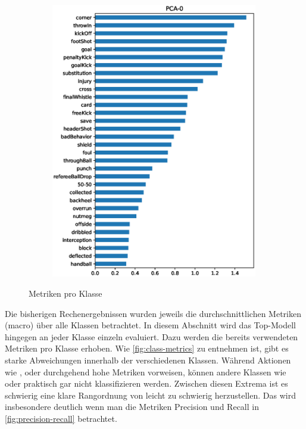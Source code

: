 \begin{figure}
\begin{subfigure}{.24\textwidth}
        \includegraphics[width=0.99\textwidth, keepaspectratio, interpolate]{img/07_PCA_by_class_test_202012-2218-2843.eps}
    \end{subfigure}
    \caption{Metriken pro Klasse}
    \label{fig:class-metrics}
\end{figure}

Die bisherigen Rechenergebnissen wurden jeweils die durchschnittlichen Metriken (macro) über alle Klassen betrachtet.
In diesem Abschnitt wird das Top-Modell hingegen an jeder Klasse einzeln evaluiert.
Dazu werden die bereits verwendeten Metriken pro Klasse erhoben.
Wie \autoref{fig:class-metrics} zu entnehmen ist, gibt es starke Abweichungen innerhalb der verschiedenen Klassen.
Während Aktionen wie ,  oder  durchgehend hohe Metriken vorweisen, können andere Klassen wie  oder  praktisch gar nicht klassifizieren werden.
Zwischen diesen Extrema ist es schwierig eine klare Rangordnung von leicht zu schwierig herzustellen.
Das wird insbesondere deutlich wenn man die Metriken Precision und Recall in \autoref{fig:precision-recall} betrachtet.

